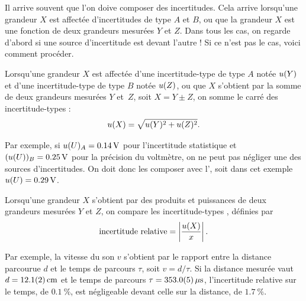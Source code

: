 Il arrive souvent que l’on doive composer des incertitudes. Cela arrive lorsqu’une grandeur $X$ est affectée d’incertitudes de type $A$ et $B$, ou que la grandeur $X$ est une fonction de deux grandeurs mesurées $Y$ et $Z$.
Dans tous les cas, on regarde d’abord si une source d’incertitude est  devant l’autre ! Si ce n'est pas le cas, voici comment procéder.

\begin{liste}
\item Lorsqu’une grandeur $X$ est affectée d’une incertitude-type de type $A$ notée $\incertX y$ et d’une incertitude-type de type $B$ notée $\incertX Z$, ou que  $X$ s’obtient par la somme de deux grandeurs mesurées $Y$ et~$Z$, soit $X=Y \pm Z$, on somme le carré des incertitude-types :
\begin{equation}\label{eq:compo}
\incertX x = \sqrt{\incertX y^2 + \incertX Z^2}.
\end{equation}
\begin{remarque}
Par exemple, si $\incertX u_A = \SI{0.14}{V}$ pour l'incertitude statistique et $(\incertX u)_B=\SI{0.25}{V}$ pour la précision du voltmètre, on ne peut pas négliger une des sources d’incertitudes. On doit donc les composer avec l', soit dans cet exemple $\incertX u = \SI{0.29}{V}$.
\end{remarque}

\item Lorsqu’une grandeur $X$ s’obtient par des produits et puissances de deux grandeurs mesurées $Y$ et $Z$, on compare les incertitude-types , définies par
\begin{equation}
\text{incertitude relative} = \norm{\frac{\incertX x}{x}}.
\end{equation}

\begin{remarque}
Par exemple, la vitesse du son $v$ s’obtient par le rapport entre la distance parcourue $d$ et le temps de parcours $\tau$, soit $v=d/\tau$. Si la distance mesurée vaut $d=\SI{12.1 \pm 0.2}{cm}$ et le temps de parcours $\tau=\SI{353.0\pm 0.5}{\mu s}$, l’incertitude relative sur le temps, de $\SI{0.1}{\%}$, est négligeable devant celle sur la distance, de $\SI{1.7}{\%}$.
\end{remarque}


\end{liste}
